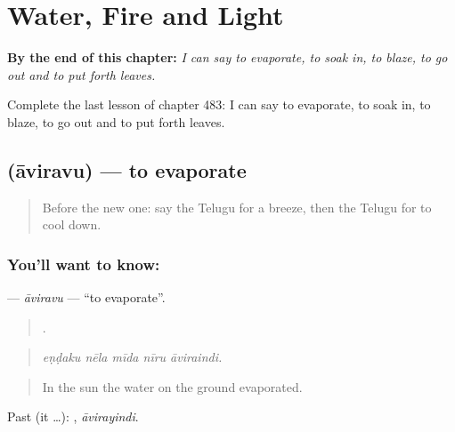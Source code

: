 
\chapter{Water, Fire and Light}
\label{ch:te-water-fire-and-light}

\begin{chapteropening}
\textbf{By the end of this chapter:} \emph{I can say to evaporate, to soak in, to blaze, to go out and to put forth leaves.}

Complete the last lesson of chapter 483: I can say to evaporate, to soak in, to blaze, to go out and to put forth leaves.
\end{chapteropening}

\section[\texorpdfstring{\te{ఆవిరవు} (āviravu)}{ఆవిరవు (āviravu)}]{ (āviravu) — to evaporate}

\label{lesson:TE-C483-aviravu}



\begin{quote}
Before the new one: say the Telugu for a breeze, then the Telugu for to cool down.
\end{quote}

\subsection*{You'll want to know: }
\textbf{} — \emph{āviravu} — \textquotedblleft{}to evaporate\textquotedblright{}.

\begin{quote}
    .
\end{quote}

\begin{quote}
\emph{eṇḍaku nēla mīda nīru āviraindi.}
\end{quote}

\begin{quote}
In the sun the water on the ground evaporated.
\end{quote}

Past (it …): , \emph{āvirayindi}.

